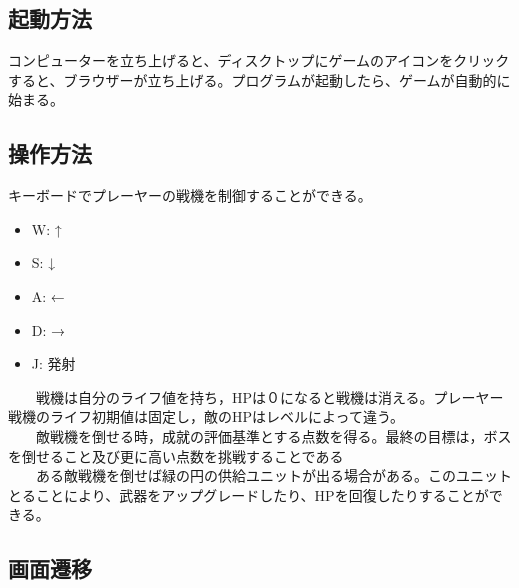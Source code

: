 \subsection{起動方法}
	コンピューターを立ち上げると、ディスクトップにゲームのアイコンをクリックすると、ブラウザーが立ち上げる。プログラムが起動したら、ゲームが自動的に始まる。
	
\subsection{操作方法}
	キーボードでプレーヤーの戦機を制御することができる。\\
	\begin{itemize}
		\item W: ↑ 
		\item S: ↓ 
		\item A: ←
		\item D: →
		\item J: 発射
	\end{itemize}
	　　戦機は自分のライフ値を持ち，HPは０になると戦機は消える。プレーヤー戦機のライフ初期値は固定し，敵のHPはレベルによって違う。\\
	　　敵戦機を倒せる時，成就の評価基準とする点数を得る。最終の目標は，ボスを倒せること及び更に高い点数を挑戦することである\\
	　　ある敵戦機を倒せば緑の円の供給ユニットが出る場合がある。このユニットとることにより、武器をアップグレードしたり、HPを回復したりすることができる。
	
\subsection{画面遷移}
